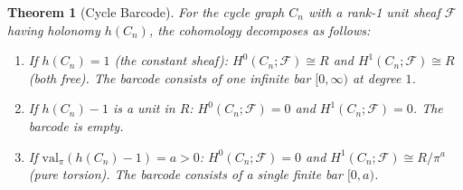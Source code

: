 \documentclass[11pt]{amsart}
\theoremstyle{plain}
\newtheorem{theorem}{Theorem}[section]
\theoremstyle{definition}
\newcommand{\valpi}{\mathrm{val}_{\unif}}                   %
\newcommand{\Ring}{R}                          %
\newcommand{\unif}{\pi}                        %
\newcommand{\sheaf}[1]{\mathcal{#1}}                  %
\begin{document}
\begin{theorem}[Cycle Barcode]
\label{thm:cycle-barcode}
For the cycle graph $C_n$ with a rank-1 unit sheaf $\sheaf{F}$ having holonomy $h(C_n)$, the cohomology decomposes as follows:
\begin{enumerate}[label=\textup{(\roman*)}]
\item If $h(C_n) = 1$ (the constant sheaf): $H^0(C_n;\sheaf{F}) \cong \Ring$ and $H^1(C_n;\sheaf{F}) \cong \Ring$ (both free). The barcode consists of one infinite bar $[0,\infty)$ at degree $1$.

\item If $h(C_n) - 1$ is a unit in $\Ring$: $H^0(C_n;\sheaf{F}) = 0$ and $H^1(C_n;\sheaf{F}) = 0$. The barcode is empty.

\item If $\valpi(h(C_n)-1) = a > 0$: $H^0(C_n;\sheaf{F}) = 0$ and $H^1(C_n;\sheaf{F}) \cong \Ring/\unif^a$ (pure torsion). The barcode consists of a single finite bar $[0,a)$.
\end{enumerate}
\end{theorem}
\end{document}
